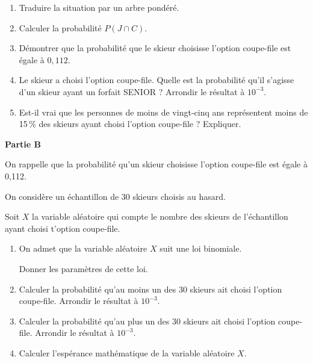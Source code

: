 \documentclass[10pt]{article}
\begin{document}
\begin{enumerate}
\item Traduire la situation par un arbre pondéré.
\item Calculer la probabilité $P(J \cap C)$.
\item Démontrer que la probabilité que le skieur choisisse l'option coupe-file est égale à $0,112$.
\item Le skieur a choisi l'option coupe-file. Quelle est la probabilité qu'il s'agisse d'un
skieur ayant un forfait SENIOR ? Arrondir le résultat à $10^{-3}$.
\item Est-il vrai que les personnes de moins de vingt-cinq ans représentent moins de 15\,\% des skieurs ayant choisi l'option coupe-file ? Expliquer.
\end{enumerate}

\bigskip

\textbf{Partie B}

\medskip

On rappelle que la probabilité qu'un skieur choisisse l'option coupe-file est égale à 0,112.

On considère un échantillon de $30$ skieurs choisis au hasard.

Soit $X$ la variable aléatoire qui compte le nombre des skieurs de l'échantillon ayant
choisi t'option coupe-file.

\medskip

\begin{enumerate}
\item On admet que la variable aléatoire $X$ suit une loi binomiale. 

Donner les paramètres de cette loi.
\item Calculer la probabilité qu'au moins un des $30$ skieurs ait choisi l'option coupe-file. Arrondir le résultat à $10^{-3}$.
\item Calculer la probabilité qu'au plus un des $30$ skieurs ait choisi l'option coupe-file. Arrondir le résultat à $10^{-3}$.
\item Calculer l'espérance mathématique de la variable aléatoire $X$.
\end{enumerate}

\bigskip
\end{document}
